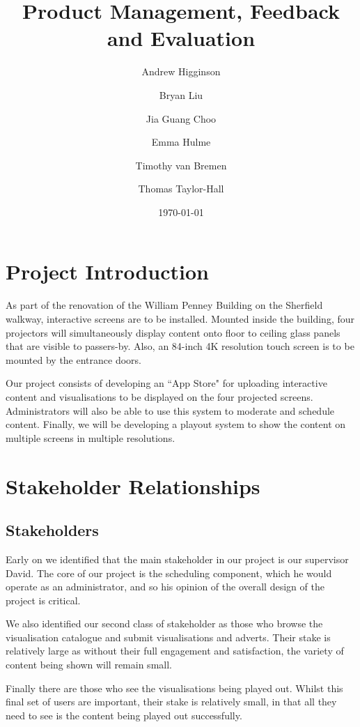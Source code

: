 \documentclass[a4paper]{article}
\begin{document}
\title{Product Management, Feedback and Evaluation}
\author{Andrew Higginson \and Bryan Liu \and Jia Guang Choo \and Emma Hulme \and 
Timothy van Bremen \and Thomas Taylor-Hall}
\date{\today}
\maketitle

\setcounter{table}{0}
\linespread{1.15}

\section{Project Introduction}
As part of the renovation of the William Penney Building on the Sherfield 
walkway, interactive screens are to be installed. Mounted inside the building,
four projectors will simultaneously display content onto floor to ceiling glass
panels that are visible to passers-by. Also, an 84-inch 4K resolution touch 
screen is to be mounted by the entrance doors. 

Our project consists of developing an ``App Store" for uploading interactive 
content and visualisations to be displayed on the four projected screens. 
Administrators will also be able to use this system to moderate and schedule 
content. Finally, we will be developing a playout system to show the content 
on multiple screens in multiple resolutions.

\section{Stakeholder Relationships}

\subsection{Stakeholders}
Early on we identified that the main stakeholder in our project is
our supervisor David. The core of our project is the scheduling component,
which he would operate as an administrator, and so his opinion of the overall
design of the project is critical. 

We also identified our second class of
stakeholder as those who browse the visualisation catalogue and submit
visualisations and adverts. Their stake is relatively large as without
their full engagement and satisfaction, the variety of content being
shown will remain small. 

Finally there are those who see the visualisations being
played out. Whilst this final set of users are important, their stake is
relatively small, in that all they need to see is the content being played
out successfully.
\end{document}
